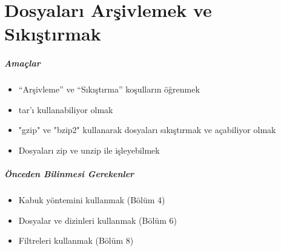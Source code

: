 \chapter{Dosyaları Arşivlemek ve Sıkıştırmak}
\paragraph{Amaçlar}
\begin{itemize}
 \item “Arşivleme” ve “Sıkıştırma” koşulların öğrenmek
 \item tar'ı kullanabiliyor olmak
 \item "gzip" ve "bzip2" kullanarak dosyaları sıkıştırmak ve açabiliyor olmak
 \item Dosyaları zip ve unzip ile işleyebilmek
 \end{itemize}
\paragraph{Önceden Bilinmesi Gerekenler}
\begin{itemize}
 \item Kabuk yöntemini kullanmak (Bölüm 4)
 \item Dosyalar ve dizinleri kullanmak (Bölüm 6)
 \item Filtreleri kullanmak (Bölüm 8)
 \end{itemize}

